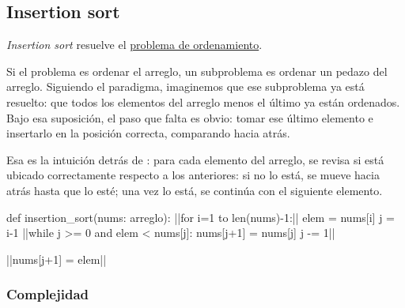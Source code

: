 \subsection{Insertion sort}
\label{sec:insertion_sort}

\textit{Insertion sort} resuelve el \hyperref[sec:problema]{problema de ordenamiento}.

Si el problema es ordenar el arreglo, un subproblema es ordenar un pedazo del arreglo. Siguiendo el paradigma, imaginemos que ese subproblema ya está resuelto: que todos los elementos del arreglo menos el último ya están ordenados. Bajo esa suposición, el paso que falta es obvio: tomar ese último elemento e insertarlo en la posición correcta, comparando hacia atrás.

Esa es la intuición detrás de : para cada elemento del arreglo, se revisa si está ubicado correctamente respecto a los anteriores: si no lo está, se mueve hacia atrás hasta que lo esté; una vez lo está, se continúa con el siguiente elemento.

\begin{codeblock}
\begin{pseudocode}
def insertion_sort(nums: arreglo):
    ||for i=1 to len(nums)-1:||
        elem = nums[i] 
        j = i-1
        ||while j >= 0 and elem < nums[j]:
            nums[j+1] = nums[j]
            j -= 1||
        
        ||nums[j+1] = elem||
\end{pseudocode}
\begin{annotations}
\end{annotations}
\end{codeblock}

\subsubsection{Complejidad}

